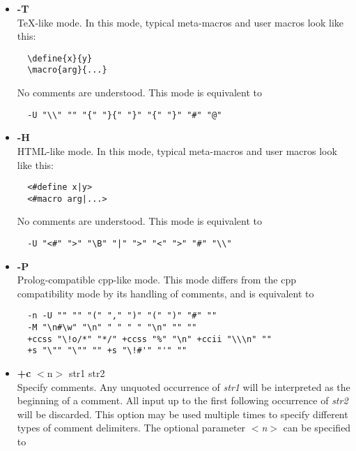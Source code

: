\begin{itemize}
occurs only at the beginning of lines, and C comments and strings are
understood. This mode is equivalent to \begin{verbatim}
  -n -U "" "" "(" "," ")" "(" ")" "#" ""
  -M "\n#\w" "\n" " " " " "\n" "" ""
  +c "/*" "*/" +c "//" "\n" +c "\\\n" ""
  +s "\"" "\"" "\\" +s "'" "'" "\\"
\end{verbatim}
\item
{\bf -T} \\
TeX-like mode. In this mode, typical meta-macros and user macros look like
this: \begin{verbatim}
  \define{x}{y}
  \macro{arg}{...}
\end{verbatim}
No comments are understood. This mode is equivalent to \begin{verbatim}
  -U "\\" "" "{" "}{" "}" "{" "}" "#" "@"
\end{verbatim}
\item
{\bf -H} \\
HTML-like mode. In this mode, typical meta-macros and user macros look like
this: \begin{verbatim}
  <#define x|y>
  <#macro arg|...>
\end{verbatim}
No comments are understood. This mode is equivalent to \begin{verbatim}
  -U "<#" ">" "\B" "|" ">" "<" ">" "#" "\\"
\end{verbatim}
\item
{\bf -P} \\
Prolog-compatible cpp-like mode. This mode differs from the cpp
compatibility mode by its handling of comments, and is equivalent to \begin{verbatim}
  -n -U "" "" "(" "," ")" "(" ")" "#" ""
  -M "\n#\w" "\n" " " " " "\n" "" ""
  +ccss "\!o/*" "*/" +ccss "%" "\n" +ccii "\\\n" ""
  +s "\"" "\"" "" +s "\!#'" "'" ""
\end{verbatim}
\item
{\bf +c} $<$n$>$ str1 str2\\
Specify comments. Any unquoted occurrence of {\it str1} will be
interpreted as the beginning of a comment. All input up to the first 
following occurrence of {\it str2} will be discarded. This 
option may be used multiple times to specify different types of comment 
delimiters. The optional parameter {\it $<$n$>$} can be specified to

\end{itemize}
